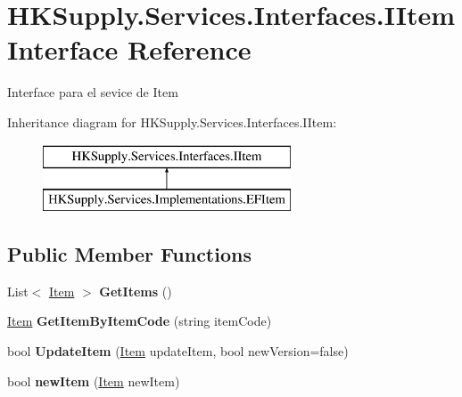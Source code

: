 \hypertarget{interface_h_k_supply_1_1_services_1_1_interfaces_1_1_i_item}{}\section{H\+K\+Supply.\+Services.\+Interfaces.\+I\+Item Interface Reference}
\label{interface_h_k_supply_1_1_services_1_1_interfaces_1_1_i_item}


Interface para el sevice de Item  


Inheritance diagram for H\+K\+Supply.\+Services.\+Interfaces.\+I\+Item\+:\begin{figure}[H]
\begin{center}
\leavevmode
\includegraphics[height=2.000000cm]{interface_h_k_supply_1_1_services_1_1_interfaces_1_1_i_item}
\end{center}
\end{figure}
\subsection*{Public Member Functions}
\begin{DoxyCompactItemize}
\item 
\mbox{\label{interface_h_k_supply_1_1_services_1_1_interfaces_1_1_i_item_a95ea3393a3acb48fefb996952ddc2ffa}} 
List$<$ \hyperlink{class_h_k_supply_1_1_models_1_1_item}{Item} $>$ {\bfseries Get\+Items} ()
\item 
\mbox{\label{interface_h_k_supply_1_1_services_1_1_interfaces_1_1_i_item_ab5a16e93feea2b2b6ef6759f20abf1e3}} 
\hyperlink{class_h_k_supply_1_1_models_1_1_item}{Item} {\bfseries Get\+Item\+By\+Item\+Code} (string item\+Code)
\item 
\mbox{\label{interface_h_k_supply_1_1_services_1_1_interfaces_1_1_i_item_a2e43fd26d882af5d51d625d6d96a66fe}} 
bool {\bfseries Update\+Item} (\hyperlink{class_h_k_supply_1_1_models_1_1_item}{Item} update\+Item, bool new\+Version=false)
\item 
\mbox{\label{interface_h_k_supply_1_1_services_1_1_interfaces_1_1_i_item_ac9b811f4faeeb0ee2a459d9e18dd6c78}} 
bool {\bfseries new\+Item} (\hyperlink{class_h_k_supply_1_1_models_1_1_item}{Item} new\+Item)
\end{DoxyCompactItemize}


